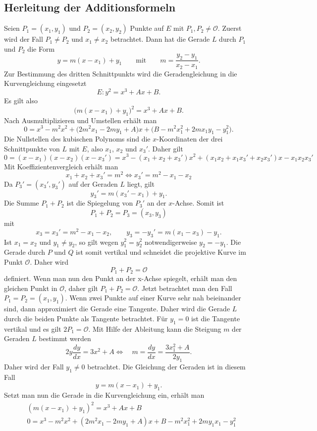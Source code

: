 \subsection{Herleitung der Additionsformeln}
Seien $P_1=(x_1,y_1)$ und $P_2=(x_2,y_2)$ Punkte auf $E$ mit $P_1,P_2\neq \mathcal{O}$. Zuerst wird der Fall $P_1\neq P_2$ und \(x_1\neq x_2\) betrachtet. Dann hat die Gerade \(L\) durch \(P_1\) und \(P_2\) die Form
\[
    y=m(x-x_1)+y_1
    \qquad \text{mit} \qquad
    m=\frac{y_2-y_1}{x_2-x_1}.
\]
Zur Bestimmung des dritten Schnittpunkts wird die Geradengleichung in die Kurvengleichung eingesetzt
\[
    E: y^2=x^3+Ax+B.
\]
Es gilt also
\[
    {\bigl(m(x-x_1)+y_1\bigr)}^2=x^3+Ax+B.
\]
Nach Ausmultiplizieren und Umstellen erhält man
\[
    0=x^3-m^2x^2+\bigl(2m^2x_1-2my_1+A\bigr)x
    +\bigl(B-m^2x_1^2+2mx_1y_1-y_1^2\bigr).
\]
Die Nullstellen des kubischen Polynoms sind die \(x\)-Koordinaten der drei Schnittpunkte von \(L\) mit \(E\), also \(x_1\), \(x_2\) und \(x_3'\). Daher gilt
\[
    0=(x-x_1)(x-x_2)(x-x_3')
    =x^3-(x_1+x_2+x_3')x^2+(x_1x_2+x_1x_3'+x_2x_3')x-x_1x_2x_3'
\]
Mit Koeffizientenvergleich erhält man
\[
    x_1+x_2+x_3' = m^2 \Leftrightarrow  x_3' = m^2-x_1-x_2
\]
Da \(P_3'=(x_3',y_3')\) auf der Geraden \(L\) liegt, gilt
\[
    y_3'=m(x_3'-x_1)+y_1.
\]
Die Summe \(P_1+P_2\) ist die Spiegelung von \(P_3'\) an der \(x\)-Achse. Somit ist
\[
    P_1+P_2=P_3=(x_3,y_3)
\]
mit
\[
    x_3=x_3'=m^2-x_1-x_2,
    \qquad
    y_3=-y_3'=m(x_1-x_3)-y_1.
\]
Ist $x_1=x_2$ und $y_1\neq y_2$, so gilt wegen $y_1^2=y_2^2$ notwendigerweise $y_2=-y_1$. Die Gerade durch $P$ und $Q$ ist somit vertikal und schneidet die projektive Kurve im Punkt $\mathcal{O}$. Daher wird
\[
    P_1+P_2=\mathcal{O}
\]
definiert. Wenn man nun den Punkt an der x-Achse spiegelt, erhält man den gleichen Punkt in $\mathcal{O}$, daher gilt $P_1+P_2=\mathcal{O}$. Jetzt betrachtet man den Fall $P_1=P_2=(x_1,y_1)$. Wenn zwei Punkte auf einer Kurve sehr nah beieinander sind, dann approximiert die Gerade eine Tangente. Daher wird die Gerade $L$ durch die beiden Punkte als Tangente betrachtet. Für $y_1=0$ ist die Tangente vertikal und es gilt $2P_1=\mathcal O$. Mit Hilfe der Ableitung kann die Steigung $m$ der Geraden $L$ bestimmt werden
\[
    2y\frac{dy}{dx}=3x^2+A \Leftrightarrow \quad m=\frac{dy}{dx}=\frac{3x_1^2+A}{2y_1}.
\]
Daher wird der Fall $y_1\neq 0$ betrachtet. Die Gleichung der Geraden ist in diesem Fall
\[
    y=m(x-x_1)+y_1.
\]
Setzt man nun die Gerade in die Kurvengleichung ein, erhält man
\begin{align}
     & {(m(x-x_1)+y_1)}^2=x^3+Ax+B                               \\
     & 0=x^3-m^2x^2+(2m^2x_1-2my_1+A)x+B-m^2x_1^2+2my_1x_1-y_1^2
\end{align}
